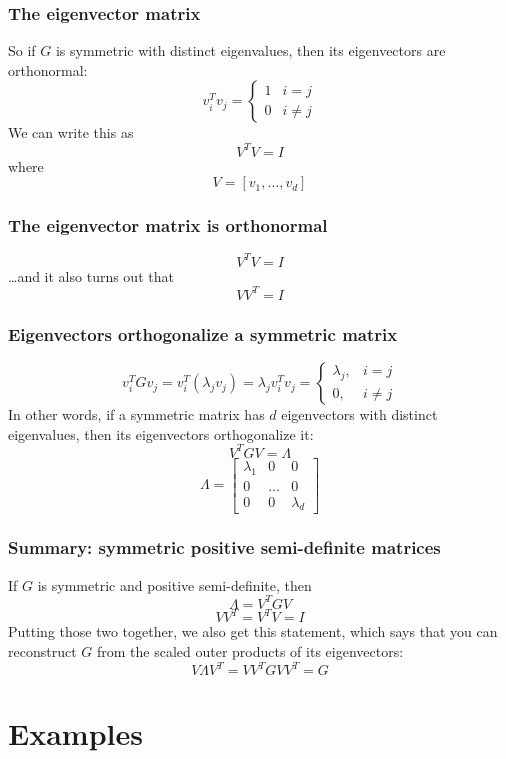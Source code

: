 \documentclass{beamer}
\begin{document}
\begin{frame}
  \frametitle{The eigenvector matrix}
  So if $G$ is symmetric with distinct eigenvalues, then
  its eigenvectors  are orthonormal:
  \[
  {v}_i^T{v}_j=
  \begin{cases}
    1&i=j\\
    0&i\ne j
  \end{cases}
  \]
  We can  write this as
  \[
  V^TV = I
  \]
  where
  \[
  V=\left[{v}_1,\ldots,{v}_{d}\right]
  \]
\end{frame}

\begin{frame}
  \frametitle{The eigenvector matrix is orthonormal}
  \[
  V^TV = I
  \]
  \ldots and it also turns out that
  \[
  VV^T = I
  \]
\end{frame}

\begin{frame}
  \frametitle{Eigenvectors orthogonalize a symmetric matrix}
  \[
  {v}_i^TG{v}_j=
  {v}_i^T(\lambda_j{v}_j)=\lambda_j{v}_i^T{v}_j
  =\begin{cases}\lambda_j,&i=j\\0,&i\ne j\end{cases}
  \]
  In other words, if a symmetric matrix has $d$ eigenvectors with
  distinct eigenvalues, then its eigenvectors orthogonalize it:
  \[
  V^TG V = \Lambda
  \]
  \[
  \Lambda=
  \left[\begin{array}{ccc}\lambda_1&0&0\\0&\ldots&0\\0&0&\lambda_{d}\end{array}\right]
  \]
\end{frame}

\begin{frame}
  \frametitle{Summary: symmetric positive semi-definite matrices}

  If $G$ is symmetric and positive semi-definite, then
  \[
  \Lambda = V^TG V
  \]
  \[
  VV^T=V^TV=I
  \]
  Putting those two together, we also get this statement, which says
  that you can reconstruct $G$ from the scaled outer products of
  its eigenvectors:
  \[
  V\Lambda V^T = VV^TG VV^T = G
  \]
\end{frame}

\section{Examples}
\setcounter{subsection}{1}
\end{document}
